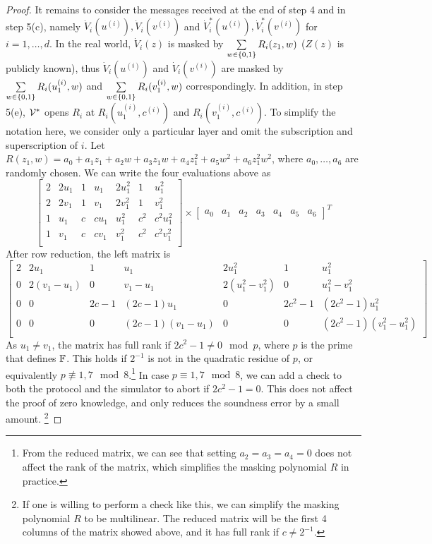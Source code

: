 \begin{proof}
It remains to consider the messages received at the end of step 4 and in step 5(c), namely $\dot{V}_{i}(u^{(i)}), \dot{V}_{i}(v^{(i)})$ and $\dot{V}^*_{i}(u^{(i)}), \dot{V}^*_{i}(v^{(i)})$ for $i = 1,\ldots,d$. In the real world, $\dot{V}_{i}(z)$ is masked by $\sum\limits_{w \in\{0,1\}}R_i(z_1,w)$ ($Z(z)$ is publicly known), thus $\dot{V}_{i}(u^{(i)})$ and $\dot{V}_{i}(v^{(i)})$ are masked by $\sum\limits_{w \in\{0,1\}}R_i(u_1^{(i)},w)$ and $\sum\limits_{w \in\{0,1\}}R_i(v_1^{(i)},w)$ correspondingly. In addition, in step 5(e), $\mathcal{V}^*$ opens $R_i$ at $R_i(u_1^{(i)},c^{(i)})$ and $R_i(v_1^{(i)},c^{(i)})$. To simplify the notation here, we consider only a particular layer and omit the subscription and superscription of $i$. Let $R(z_1,w) = a_0+a_1z_1+a_2w+a_3z_1w+a_4z_1^2+a_5w^2+a_6z_1^2w^2$, where $a_0,\ldots,a_6$ are randomly chosen. We can write the four evaluations above as 
\[
\begin{bmatrix}
2 & 2u_1 & 1 & u_1 & 2u_1^2 & 1 & u_1^2\\
2 & 2v_1 & 1 & v_1& 2v_1^2 & 1 & v_1^2\\
1 & u_1 & c & cu_1 & u_1^2 & c^2 & c^2u_1^2\\
1 & v_1 & c & cv_1 &  v_1^2 & c^2 & c^2v_1^2\\
\end{bmatrix}
\times
\begin{bmatrix}
a_0 & a_1 &a_2 &a_3&a_4&a_5&a_6
\end{bmatrix}^T
\]
After row reduction, the left matrix is
\[
\begin{bmatrix}
2 & 2u_1 & 1 & u_1 & 2u_1^2 & 1 & u_1^2\\
0 & 2(v_1-u_1) & 0 & v_1-u_1 & 2(u_1^2-v_1^2) & 0 & u_1^2-v_1^2\\
0 & 0 & 2c-1 & (2c-1)u_1 & 0 & 2c^2-1 & (2c^2-1)u_1^2\\
0 & 0 & 0 & (2c-1)(v_1-u_1)&0 & 0 & (2c^2-1)(v_1^2-u_1^2)\\
\end{bmatrix}
\]
As $u_1\neq v_1$, the matrix has full rank if $2c^2 - 1\neq 0 \mod p$, where $p$ is the prime that defines $\mathbb{F}$. This holds if $2^{-1}$ is not in the quadratic residue of $p$, or equivalently $p \not\equiv 1, 7 \mod 8$.\footnote{From the reduced matrix, we can see that setting $a_2 = a_3 = a_4 = 0$ does not affect the rank of the matrix, which simplifies the masking polynomial $R$ in practice.} In case $p\equiv 1, 7 \mod 8$, we can add a check to both the protocol and the simulator to abort if $2c^2 -1 =0$. This does not affect the proof of zero knowledge, and only reduces the soundness error by a small amount. \footnote{If one is willing to perform a check like this, we can simplify the masking polynomial $R$ to be multilinear. The reduced matrix will be the first 4 columns of the matrix showed above, and it has full rank if $c\neq 2^{-1}$.}



\end{proof}
